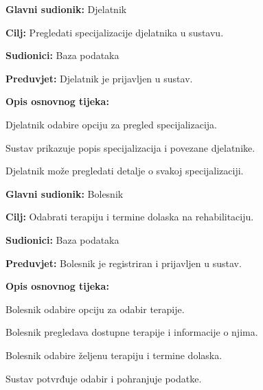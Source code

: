 \documentclass{article}
\begin{document}
\vspace{1em} %
\begin{packed_item}
\item \textbf{Glavni sudionik:} Djelatnik
\item \textbf{Cilj:} Pregledati specijalizacije djelatnika u sustavu.
\item \textbf{Sudionici:} Baza podataka
\item \textbf{Preduvjet:} Djelatnik je prijavljen u sustav.
\item \textbf{Opis osnovnog tijeka:}
\begin{packed_enum}
\item Djelatnik odabire opciju za pregled specijalizacija.
\item Sustav prikazuje popis specijalizacija i povezane djelatnike.
\item Djelatnik može pregledati detalje o svakoj specijalizaciji.
\end{packed_enum}
\end{packed_item}

\vspace{1em} %
\begin{packed_item}
\item \textbf{Glavni sudionik:} Bolesnik
\item \textbf{Cilj:} Odabrati terapiju i termine dolaska na rehabilitaciju.
\item \textbf{Sudionici:} Baza podataka
\item \textbf{Preduvjet:} Bolesnik je registriran i prijavljen u sustav.
\item \textbf{Opis osnovnog tijeka:}
\begin{packed_enum}
\item Bolesnik odabire opciju za odabir terapije.
\item Bolesnik pregledava dostupne terapije i informacije o njima.
\item Bolesnik odabire željenu terapiju i termine dolaska.
\item Sustav potvrđuje odabir i pohranjuje podatke.
\end{packed_enum}
\end{packed_item}
\end{document}
